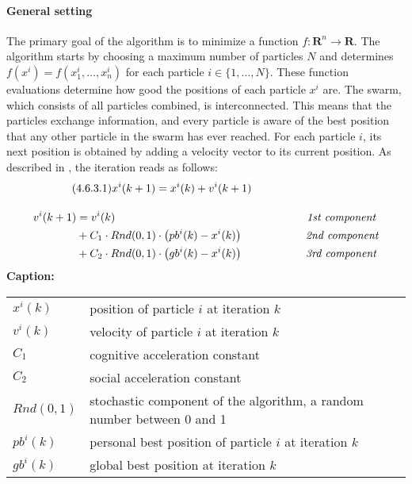 \paragraph{General setting}
The primary goal of the algorithm is to minimize a function $f: \mathbf{R}^n \longrightarrow \mathbf{R}.$ The algorithm starts by choosing a maximum number of particles $N$ and determines $f(x^{i}) = f(x_{1}^{i},\ldots,x_{n}^{i})$ for each particle $i \in \{1,\ldots,N\}.$ These function evaluations determine how good the positions of each particle $x^{i}$ are.
The swarm, which consists of all particles combined, is interconnected. This means that the particles exchange information, and every particle is aware of the best position that any other particle in the swarm has ever reached. For each particle $i$, its next position is obtained by adding a velocity vector to its current position. As described in \cite[2]{PSO}, the iteration reads as follows:
\begin{gather*}\tag{4.6.3.1}
x^{i}(k + 1) = x^{i}(k) + v^{i}(k+1)\hspace{3.5cm}\\
\rule{0pt}{3.5em} %
\begin{aligned}
v^{i}(k+1) &= v^{i}(k) \hspace{6.095cm}\textit{1st component}\\ 
&+ C_{1} \cdot Rnd(0, 1) \cdot \left(pb^{i}(k) - x^{i}(k)\right) \hspace{2cm}\textit{2nd component}\\
&+ C_{2} \cdot Rnd(0, 1) \cdot \left(gb^{i}(k) - x^{i}(k)\right) \hspace{2cm}\textit{3rd component}
\end{aligned}
\end{gather*}
\textbf{Caption:}\\
\rule{0pt}{4.5em} %
\begin{tabular}{ll}
$x^{i}(k)$ & position of particle $i$ at iteration $k$\\
$v^{i}(k)$ & velocity of particle $i$ at iteration $k$\\
$C_{1}$ & cognitive acceleration constant\\
$C_{2}$ & social acceleration constant\\
$Rnd(0, 1)$ & stochastic component of the algorithm, a random number between 0 and 1\\
$pb^{i}(k)$ & personal best position of particle $i$ at iteration $k$\\
$gb^{i}(k)$ & global best position at iteration $k$
\end{tabular}\\
